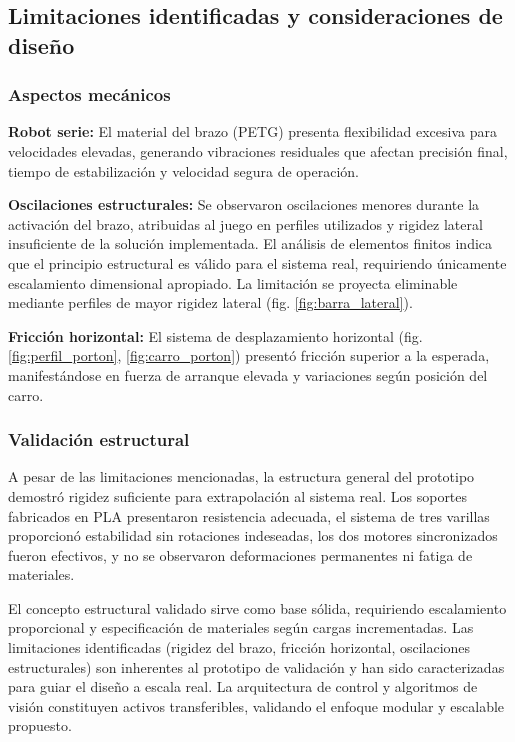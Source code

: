 \subsection{Limitaciones identificadas y consideraciones de diseño}

\subsubsection{Aspectos mecánicos}

\textbf{Robot serie:} El material del brazo (PETG) presenta flexibilidad excesiva para velocidades elevadas, generando vibraciones residuales que afectan precisión final, tiempo de estabilización y velocidad segura de operación.

\textbf{Oscilaciones estructurales:} Se observaron oscilaciones menores durante la activación del brazo, atribuidas al juego en perfiles utilizados y rigidez lateral insuficiente de la solución implementada. El análisis de elementos finitos indica que el principio estructural es válido para el sistema real, requiriendo únicamente escalamiento dimensional apropiado. La limitación se proyecta eliminable mediante perfiles de mayor rigidez lateral (fig. \ref{fig:barra_lateral}).

\textbf{Fricción horizontal:} El sistema de desplazamiento horizontal (fig. \ref{fig:perfil_porton}, \ref{fig:carro_porton}) presentó fricción superior a la esperada, manifestándose en fuerza de arranque elevada y variaciones según posición del carro.

\subsubsection{Validación estructural}

A pesar de las limitaciones mencionadas, la estructura general del prototipo demostró rigidez suficiente para extrapolación al sistema real. Los soportes fabricados en PLA presentaron resistencia adecuada, el sistema de tres varillas proporcionó estabilidad sin rotaciones indeseadas, los dos motores sincronizados fueron efectivos, y no se observaron deformaciones permanentes ni fatiga de materiales.

El concepto estructural validado sirve como base sólida, requiriendo escalamiento proporcional y especificación de materiales según cargas incrementadas. Las limitaciones identificadas (rigidez del brazo, fricción horizontal, oscilaciones estructurales) son inherentes al prototipo de validación y han sido caracterizadas para guiar el diseño a escala real. La arquitectura de control y algoritmos de visión constituyen activos transferibles, validando el enfoque modular y escalable propuesto.
